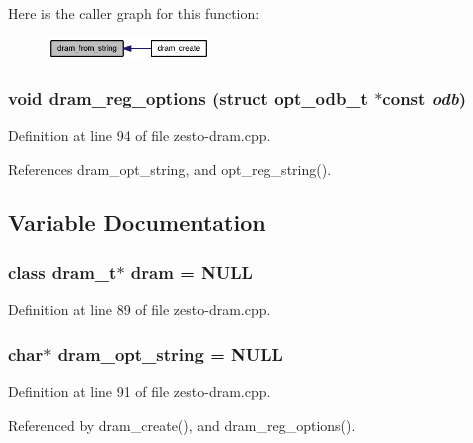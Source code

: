 Here is the caller graph for this function:\nopagebreak
\begin{figure}[H]
\begin{center}
\leavevmode
\includegraphics[width=121pt]{zesto-dram_8cpp_32a8dd812947abef74cd51c932d75127_icgraph}
\end{center}
\end{figure}
\subsubsection[{dram\_\-reg\_\-options}]{\setlength{\rightskip}{0pt plus 5cm}void dram\_\-reg\_\-options (struct {\bf opt\_\-odb\_\-t} $\ast$const  {\em odb})}\label{zesto-dram_8cpp_ed0771b152d1f5deb1a8b7e4955f71a7}




Definition at line 94 of file zesto-dram.cpp.

References dram\_\-opt\_\-string, and opt\_\-reg\_\-string().

\subsection{Variable Documentation}
\subsubsection[{dram}]{\setlength{\rightskip}{0pt plus 5cm}class {\bf dram\_\-t}$\ast$ {\bf dram} = NULL}\label{zesto-dram_8cpp_a8026313a138e58afe2d5bff2f34dcfe}




Definition at line 89 of file zesto-dram.cpp.
\subsubsection[{dram\_\-opt\_\-string}]{\setlength{\rightskip}{0pt plus 5cm}char$\ast$ {\bf dram\_\-opt\_\-string} = NULL\hspace{0.3cm}{\tt  [static]}}\label{zesto-dram_8cpp_3c98f5205d13ec620ef18280f2560545}




Definition at line 91 of file zesto-dram.cpp.

Referenced by dram\_\-create(), and dram\_\-reg\_\-options().